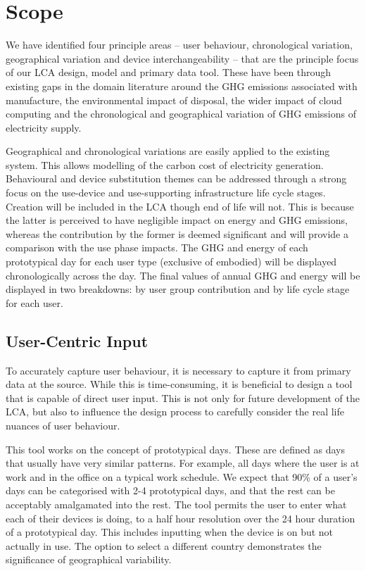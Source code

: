 \documentclass[conference]{IEEEtran}
\begin{document}
\section{Scope}
We have identified four principle areas -- user behaviour,
chronological variation, geographical variation and device
interchangeability -- that are the principle focus of our LCA design,
model and primary data tool. These have been through existing gaps in
the domain literature around the GHG emissions associated with
manufacture, the environmental impact of disposal, the wider impact of
cloud computing and the chronological and geographical variation of
GHG emissions of electricity supply.

Geographical and chronological variations are easily applied to the
existing system. This allows modelling of the carbon cost of
electricity generation. Behavioural and device substitution themes can
be addressed through a strong focus on the use-device and
use-supporting infrastructure life cycle stages. Creation will be
included in the LCA though end of life will not. This is because the
latter is perceived to have negligible impact on energy and GHG
emissions, whereas the contribution by the former is deemed
significant and will provide a comparison with the use phase
impacts. The GHG and energy of each prototypical day for each user
type (exclusive of embodied) will be displayed chronologically across
the day. The final values of annual GHG and energy will be displayed
in two breakdowns: by user group contribution and by life cycle stage
for each user.

\subsection{User-Centric Input}

To accurately capture user behaviour, it is necessary to capture it
from primary data at the source. While this is time-consuming, it is
beneficial to design a tool that is capable of direct user input. This is not
only for future development of the LCA, but also to influence the
design process to carefully consider the real life nuances of user
behaviour.

This tool works on the concept of prototypical days. These are defined
as days that usually have very similar patterns. For example, all days
where the user is at work and in the office on a typical work
schedule. We expect that 90\% of a user's days can be categorised with
2-4 prototypical days, and that the rest can be acceptably amalgamated
into the rest. The tool permits the user to enter what each of their
devices is doing, to a half hour resolution over the 24 hour duration
of a prototypical day. This includes inputting when the device is on
but not actually in use.  The option to select a different country
demonstrates the significance of geographical variability.
\end{document}
